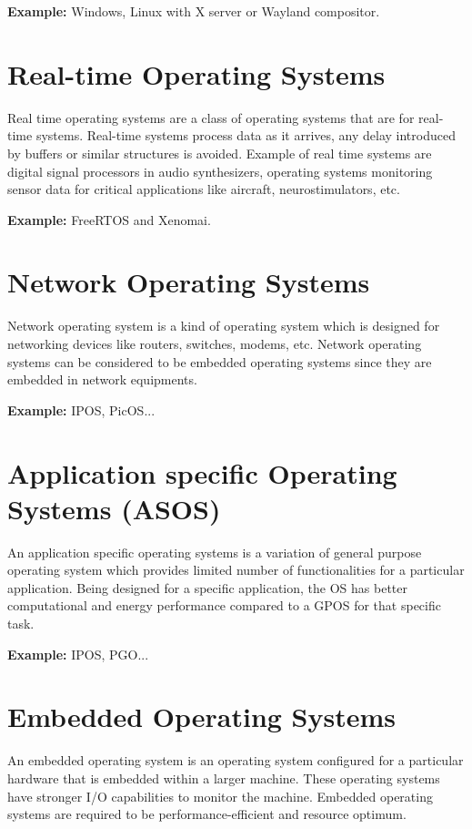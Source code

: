 \documentclass[a4,11pt]{article}
\begin{document}
\begin{multicols}{2}
  \textbf{Example:} Windows, Linux with X server or Wayland compositor.
  
  \section{Real-time Operating Systems}
  Real time operating systems are a class of operating systems that
  are for real-time systems. Real-time systems process data as it
  arrives, any delay introduced by buffers or similar structures is
  avoided. Example of real time systems are digital signal processors
  in audio synthesizers, operating systems monitoring sensor data for
  critical applications like aircraft, neurostimulators, etc.

  \textbf{Example:} FreeRTOS and Xenomai.
  
  \section{Network Operating Systems}
  Network operating system is a kind of operating system which is
  designed for networking devices like routers, switches, modems,
  etc. Network operating systems can be considered to be embedded
  operating systems since they are embedded in network equipments.

  \textbf{Example:} IPOS, PicOS...
  
  \section{Application specific Operating Systems (ASOS)}
  An application specific operating systems is a variation of general
  purpose operating system which provides limited number of
  functionalities for a particular application. Being designed for a
  specific application, the OS has better computational and energy
  performance compared to a GPOS for that specific task.

  \textbf{Example:} IPOS, PGO...
  
  \section{Embedded Operating Systems}
  An embedded operating system is an operating system configured for
  a particular hardware that is embedded within a larger machine. These
  operating systems have stronger I/O capabilities to monitor the
  machine. Embedded operating systems are required to be
  performance-efficient and resource optimum.
  

\end{multicols}
\end{document}
